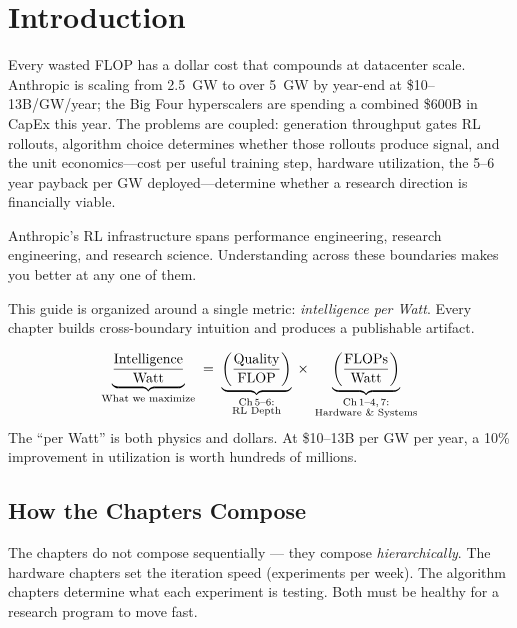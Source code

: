 \section{Introduction}

Every wasted FLOP has a dollar cost that compounds at datacenter scale. Anthropic is scaling from 2.5~GW to over 5~GW by year-end at \$10--13B/GW/year; the Big Four hyperscalers are spending a combined \$600B in CapEx this year. The problems are coupled: generation throughput gates RL rollouts, algorithm choice determines whether those rollouts produce signal, and the unit economics---cost per useful training step, hardware utilization, the 5--6 year payback per GW deployed---determine whether a research direction is financially viable.

Anthropic's RL infrastructure spans performance engineering, research engineering, and research science. Understanding across these boundaries makes you better at any one of them.

This guide is organized around a single metric: \textit{intelligence per Watt}. Every chapter builds cross-boundary intuition and produces a publishable artifact.


\begin{tcolorbox}[colback=matcha!5!white, colframe=matcha!70!black, boxrule=0.6pt,
  left=5pt, right=5pt, top=6pt, bottom=6pt,
  fonttitle=\bfseries, title=The Governing Metric]
\[
\underbrace{\frac{\text{Intelligence}}{\text{Watt}}}_{\text{What we maximize}}
\;=\;
\underbrace{\left(\frac{\text{Quality}}{\text{FLOP}}\right)}_{\substack{\text{Ch\,5--6:}\\\text{RL Depth}}}
\;\times\;
\underbrace{\left(\frac{\text{FLOPs}}{\text{Watt}}\right)}_{\substack{\text{Ch\,1--4,\,7:}\\\text{Hardware \& Systems}}}
\]
\smallskip
The ``per Watt'' is both physics and dollars. At \$10--13B per GW per year, a 10\% improvement in utilization is worth hundreds of millions.
\end{tcolorbox}


\subsection{How the Chapters Compose}

The chapters do not compose sequentially --- they compose \textit{hierarchically}. The hardware chapters set the iteration speed (experiments per week). The algorithm chapters determine what each experiment is testing. Both must be healthy for a research program to move fast.

